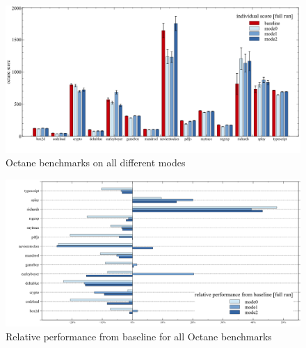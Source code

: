 \begin{figure}[ht]
  \begin{center}
    \centering
    \includegraphics[width=1.0\textwidth]{figures/octane.png}
    \caption{Octane benchmarks on all different modes}
    \label{f:octane}
  \end{center}
\end{figure}

\begin{figure}[ht]
  \begin{center}
    \centering
    \includegraphics[width=1.0\textwidth]{figures/octane_variation.png}
    \caption{Relative performance from baseline for all Octane benchmarks}
    \label{f:octane_variation}
  \end{center}
\end{figure}


